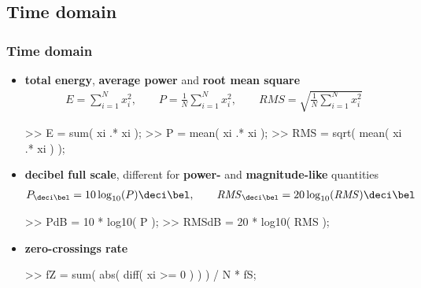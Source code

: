 
\subsection{Time domain}

\begin{frame}[fragile]
	\frametitle{Time domain}
	\begin{itemize}
		\item \textbf{total energy}, \textbf{average power} and \textbf{root mean square}
			\begin{align*}
				E=\sum_{i=1}^Nx_i^2,\qquad P=\frac1N\sum_{i=1}^Nx_i^2,\qquad\mathit{RMS}=\sqrt{\frac1N\sum_{i=1}^Nx_i^2}
			\end{align*}
			\begin{code}
>> E = sum( xi .* xi ); \color{medium}%
>> P = mean( xi .* xi ); \color{medium}%
>> RMS = sqrt( mean( xi .* xi ) ); \color{medium}%
			\end{code}
		\item \textbf{decibel full scale}, different for \textbf{power-} and \textbf{magnitude-like} quantities
			\begin{align*}
				P_{\deci\bel}=10\log_{10}(P)\deci\bel,\qquad\mathit{RMS}_{\deci\bel}=20\log_{10}(\mathit{RMS})\deci\bel
			\end{align*}
			\begin{code}
>> PdB = 10 * log10( P ); \color{medium}%
>> RMSdB = 20 * log10( RMS ); \color{medium}%
			\end{code}
		\item \textbf{zero-crossings rate}
			\begin{code}
>> fZ = sum( abs( diff( xi >= 0 ) ) ) / N * fS;
			\end{code}
	\end{itemize}
\end{frame}

